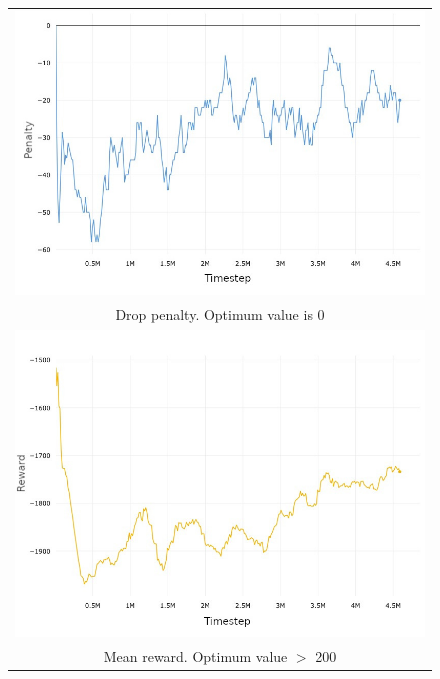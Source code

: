 \documentclass{beamer}
\begin{document}
\begin{frame}
\begin{columns}[c]
			\begin{figure}
				\begin{tabular}{c}
					\includegraphics[scale=0.65]{ppo-simulation-drop-penalty.jpeg} \\
					{\small Drop penalty. Optimum value is 0} \\ \includegraphics[scale=0.65]{ppo-simulation-reward-mean.jpeg} \\
					{\small Mean reward. Optimum value $>$ 200} \\
				\end{tabular}
			\end{figure}
		\end{columns}
	\end{frame}
\end{document}
